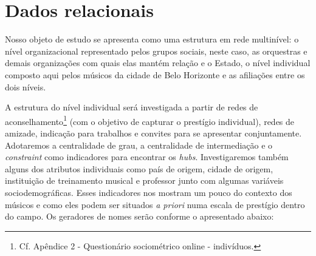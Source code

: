 \documentclass[a4paper, 12pt, openright, oneside, german, french, english, brazil]{abntex2}
\begin{document}
	
	
	\section{Dados relacionais}\label{sec:geradores_nomes}
	
	
	Nosso objeto de estudo se apresenta como uma estrutura em rede multinível: o nível organizacional representado pelos grupos sociais, neste caso, as orquestras e demais organizações com quais elas mantém relação e o Estado, o nível individual composto aqui pelos músicos da cidade de Belo Horizonte e as afiliações entre os dois níveis.
	

	
	A estrutura do nível individual será investigada a partir de redes de aconselhamento\footnote{Cf. Apêndice 2 - Questionário sociométrico online - indivíduos.} (com o objetivo de capturar o prestígio individual), redes de amizade, indicação para trabalhos e convites para se apresentar conjuntamente. Adotaremos a centralidade de grau, a centralidade de intermediação e o \textit{constraint} como indicadores para encontrar os \textit{hubs}. Investigaremos também alguns dos atributos individuais como país de origem, cidade de origem, instituição de treinamento musical e professor junto com algumas variáveis sociodemográficas. Esses indicadores nos mostram um pouco do contexto dos músicos e como eles podem ser situados \textit{a priori} numa escala de prestígio dentro do campo. Os geradores de nomes serão conforme o apresentado abaixo:
	
\end{document}
